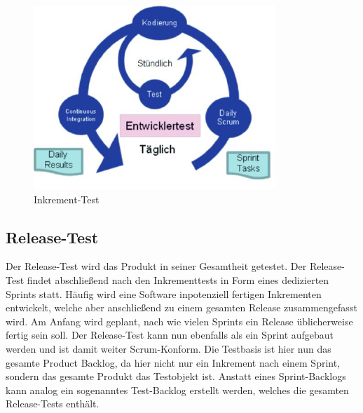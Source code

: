 \begin{figure}[!htb]
    \centering
    \includegraphics[width=.9\textwidth]{figures/rebecca/Inkrement_Test.png}
    \caption[]{Inkrement-Test}
    \label{fig:InkrementTest}
\end{figure}

\subsection{Release-Test}
\label{sub:release_test}

Der Release-Test wird das Produkt in seiner Gesamtheit getestet. Der Release-Test findet abschließend nach den Inkrementtests in Form eines dedizierten Sprints statt. Häufig wird eine Software inpotenziell fertigen Inkrementen entwickelt, welche aber anschließend zu einem gesamten Release zusammengefasst wird. Am Anfang wird geplant, nach wie vielen Sprints ein Release üblicherweise fertig sein soll. Der Release-Test kann nun ebenfalls als ein Sprint aufgebaut werden und ist damit weiter Scrum-Konform. Die Testbasis ist hier nun das gesamte Product Backlog, da hier nicht nur ein Inkrement nach einem Sprint, sondern das gesamte Produkt das Testobjekt ist. Anstatt eines Sprint-Backlogs kann analog ein sogenanntes Test-Backlog erstellt werden, welches die gesamten Release-Tests enthält.

